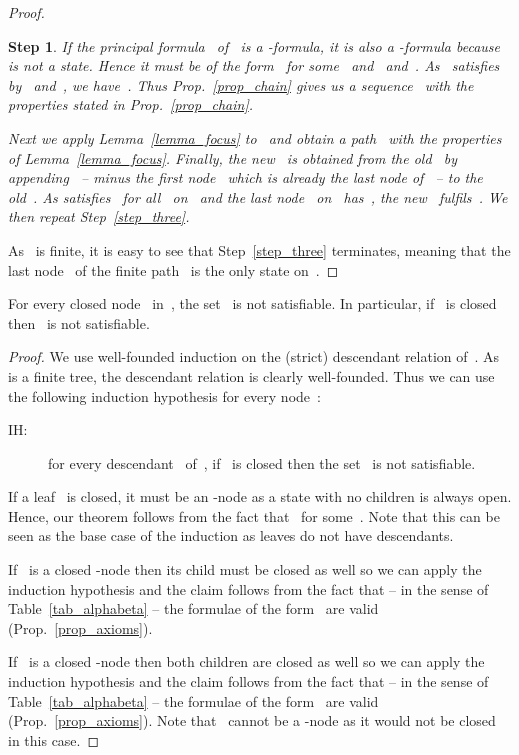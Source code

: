 \documentclass{entcs}
\newtheorem{stp}{Step}
\newenvironment{step}{\vspace{-\lastskip}\par \addvspace{.6pc
    plus .2pc minus .1pc}\begin{stp}\rm}{\end{stp}\par\addvspace{.6pc
    plus .2pc minus .1pc}}
\newcommand{\fea}{}
\newcommand{\fean}{}
\newcommand{\trid}{}
\newcommand{\trert}{}
\begin{document}
\begin{center}
\begin{proof}
\begin{step}
    If the principal formula~ of~ is a \fea{}-formula,
    it is also a \fean{}-formula because~ is not a state.
    Hence it must be of the form~
    for some~ and~ and~.
    As~ satisfies~ by~ and~,
    we have~.
    Thus Prop.~\ref{prop_chain} gives us a sequence~ 
    with the properties stated in Prop.~\ref{prop_chain}.

    Next we apply Lemma~\ref{lemma_focus} to~
    and obtain a path~ with the properties of Lemma~\ref{lemma_focus}.
    Finally,
    the new~ is obtained from the old~ by appending~
    -- minus the first node~
    which is already the last node of~ -- to the old~.
    As  satisfies~ for all~ on~
    and the last node~ on~ has~,
    the new~ fulfils~.
    We then repeat Step~\ref{step_three}.
  \end{step}
  As~ is finite, it is easy to see that Step~\ref{step_three} terminates,
  meaning that the last node~ of the finite path~ is the only state on~.
\end{proof}

\begin{lemma}
  \label{lemma_marked}
  For every closed node~ in~,
  the set~ is not satisfiable.
  In particular, if~ is closed then~ is not satisfiable.
\end{lemma}
\begin{proof}
  We use well-founded induction on the (strict) descendant relation of~.
  As~ is a finite tree, the descendant relation is clearly well-founded.
  Thus we can use the following induction hypothesis for every node~:
  \begin{description}
  \item[IH:] for every descendant~ of~,
    if~ is closed then the set~ is not satisfiable.
  \end{description}

  If a leaf~ is closed,
  it must be an \trid{}-node
  as a state with no children is always open.
  Hence, our theorem follows from the fact
  that~ for some~.
  Note that this can be seen as the base case of the induction
  as leaves do not have descendants.

  If~ is a closed -node
  then its child must be closed as well
  so we can apply the induction hypothesis
  and the claim follows from the fact
  that -- in the sense of Table~\ref{tab_alphabeta} --
  the formulae of the form~ are valid
  (Prop.~\ref{prop_axioms}).

  If~ is a closed -node
  then both children are closed as well
  so we can apply the induction hypothesis
  and the claim follows from the fact
  that -- in the sense of Table~\ref{tab_alphabeta} --
  the formulae of the form~ are valid
  (Prop.~\ref{prop_axioms}).
  Note that~ cannot be a \trert{}-node as it would not be closed in this case.


\end{proof}
\end{center}
\end{document}

